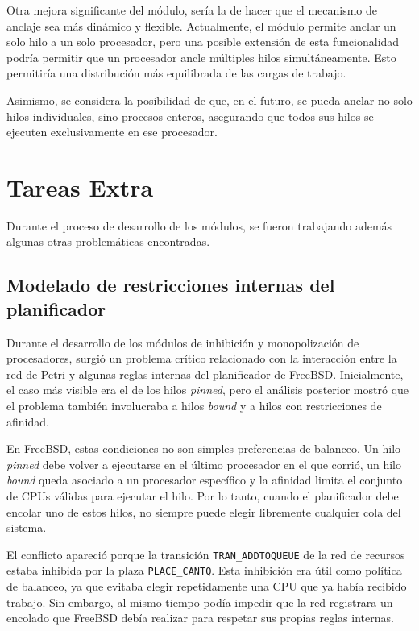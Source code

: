 Otra mejora significante del módulo, sería la de hacer que el mecanismo de anclaje sea más dinámico y flexible. Actualmente, el módulo permite anclar un solo hilo a un solo procesador, pero una posible extensión de esta funcionalidad podría permitir que un procesador ancle múltiples hilos simultáneamente. Esto permitiría una distribución más equilibrada de las cargas de trabajo.\par

Asimismo, se considera la posibilidad de que, en el futuro, se pueda anclar no solo hilos individuales, sino procesos enteros, asegurando que todos sus hilos se ejecuten exclusivamente en ese procesador.\par

\section{Tareas Extra}

Durante el proceso de desarrollo de los módulos, se fueron trabajando además algunas otras problemáticas encontradas.\par

\subsection{Modelado de restricciones internas del planificador}

Durante el desarrollo de los módulos de inhibición y monopolización de procesadores, surgió un problema crítico relacionado con la interacción entre la red de Petri y algunas reglas internas del planificador de FreeBSD. Inicialmente, el caso más visible era el de los hilos \textit{pinned}, pero el análisis posterior mostró que el problema también involucraba a hilos \textit{bound} y a hilos con restricciones de afinidad.\par

En FreeBSD, estas condiciones no son simples preferencias de balanceo. Un hilo \textit{pinned} debe volver a ejecutarse en el último procesador en el que corrió, un hilo \textit{bound} queda asociado a un procesador específico y la afinidad limita el conjunto de CPUs válidas para ejecutar el hilo. Por lo tanto, cuando el planificador debe encolar uno de estos hilos, no siempre puede elegir libremente cualquier cola del sistema.\par

El conflicto apareció porque la transición \verb|TRAN_ADDTOQUEUE| de la red de recursos estaba inhibida por la plaza \verb|PLACE_CANTQ|. Esta inhibición era útil como política de balanceo, ya que evitaba elegir repetidamente una CPU que ya había recibido trabajo. Sin embargo, al mismo tiempo podía impedir que la red registrara un encolado que FreeBSD debía realizar para respetar sus propias reglas internas.\par

